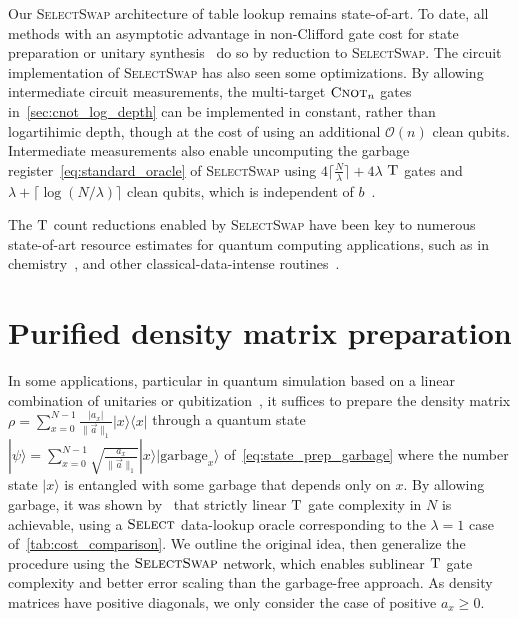 \documentclass[a4paper,onecolumn,10pt,accepted=2024-05-22]{quantumarticle}
\newcommand{\ket}[1]{| #1\rangle}        %
\newcommand{\bra}[1]{\langle #1|}        %
\begin{document}
Our \textsc{SelectSwap} architecture of table lookup remains state-of-art.
%
To date, all methods with an asymptotic advantage in non-Clifford gate cost for state preparation or unitary synthesis~\cite{Clader2022Blockencode} do so by reduction to \textsc{SelectSwap}.
%
The circuit implementation of \textsc{SelectSwap} has also seen some optimizations.
%
By allowing intermediate circuit measurements, the multi-target $\textsc{Cnot}_n$ gates in~\cref{sec:cnot_log_depth} can be implemented in constant, rather than logartihimic depth, though at the cost of using an additional $\mathcal{O}(n)$ clean qubits. 
%
Intermediate measurements also enable uncomputing the garbage register~\cref{eq:standard_oracle} of \textsc{SelectSwap} using $4\lceil\frac{N}{\lambda}\rceil+4\lambda$ $\textsc{T}$ gates and $\lambda+\lceil\log{(N/\lambda)}\rceil$ clean qubits, which is independent of $b$~\cite{Berry2019CholeskyQubitization}.  

The $\textsc{T}$ count reductions enabled by \textsc{SelectSwap} have been key to numerous state-of-art resource estimates for quantum computing applications, such as in chemistry~\cite{Berry2019CholeskyQubitization, vonBurg2020carbon, Lee2020hypercontraction, Bauer2020ChemistryReview}, and other classical-data-intense routines~\cite{Sanders2020Combinatorial,Clader2022Blockencode}. 
 

 

	

 
	\appendix
	\section{Purified density matrix preparation}
	\label{sec:purified_density_matrix}
	In some applications, particular in quantum simulation based on a linear combination of unitaries or qubitization~\cite{Berry2015Truncated,Low2016Qubitization}, it suffices to prepare the density matrix $\rho=\sum_{x=0}^{N-1}\frac{|a_x|}{\|\vec{a}\|_1}\ket{x}\bra{x}$ through a quantum state $\ket{\psi}=\sum_{x=0}^{N-1} \sqrt{\frac{a_x}{\|\vec{a}\|_1}} \ket{x}\ket{\mathrm{garbage}_x}$ of~\cref{eq:state_prep_garbage} where the number state $\ket{x}$ is entangled with some garbage that depends only on $x$. By allowing garbage, it was shown by~\cite{Babbush2018encoding} that strictly linear $\textsc{T}$ gate complexity in $N$ is achievable, using a $\textsc{Select}$ data-lookup oracle corresponding to the $\lambda=1$ case of~\cref{tab:cost_comparison}. We outline the original idea, then generalize the procedure using the $\textsc{SelectSwap}$ network, which enables sublinear $\textsc{T}$ gate complexity and better error scaling than the garbage-free approach. As density matrices have positive diagonals, we only consider the case of positive $a_x\ge0$.
	
\end{document}
